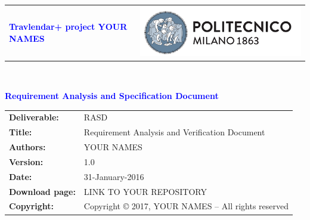 \documentclass[11pt,twoside]{article}
\begin{document}
\begin{titlepage}
{\begin{table}[t!]
\centering
\begin{tabu} to \textwidth { X[1.3,r,p] X[1.7,l,p] }
\textcolor{Blue}
{\textbf{\small{Travlendar+ project YOUR NAMES}}} & \includegraphics[scale=0.5]{Images/PolimiLogo}
\end{tabu}
\end{table}}~\\ [7cm]

\begin{flushleft}
{\textcolor{Blue}{\textbf{\Huge{Requirement Analysis and Specification
        Document}}}} \\ [1cm]
\end{flushleft}
\end{titlepage}

\begin{table}[h!]
\begin{tabu} to \textwidth { X[0.3,r,p] X[0.7,l,p] }
\hline
\textbf{Deliverable:} & RASD\\
\textbf{Title:} & Requirement Analysis and Verification Document \\
\textbf{Authors:} & YOUR NAMES \\
\textbf{Version:} & 1.0 \\ 
\textbf{Date:} & 31-January-2016 \\
\textbf{Download page:} & LINK TO YOUR REPOSITORY \\
\textbf{Copyright:} & Copyright © 2017, YOUR NAMES – All rights reserved \\
\hline
\end{tabu}
\end{table}

\setcounter{page}{2}

\newpage
{}
\tableofcontents
\newpage
{}
\listoffigures
{}
\listoftables

\clearpage
{}
\label{sect:introduction}

\end{document}
